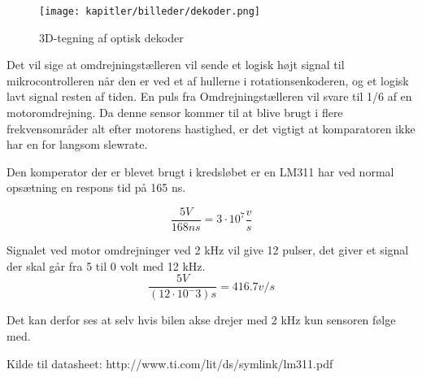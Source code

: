\begin{figure}[ht]
    \centering
    \texttt{[image: kapitler/billeder/dekoder.png]}
    \caption{3D-tegning af optisk dekoder}
    \label{fig:dekoder}
\end{figure}


Det vil sige at omdrejningstælleren vil sende et logisk højt signal til mikrocontrolleren når den er ved et af hullerne i  rotationsenkoderen, og et logisk lavt signal resten af tiden. En puls fra Omdrejningstælleren vil svare til 1/6 af en motoromdrejning.
Da denne sensor kommer til at blive brugt i flere frekvensområder alt efter motorens hastighed, er det vigtigt at komparatoren ikke har en for langsom slewrate.

Den komperator der er blevet brugt i kredsløbet er en LM311 har ved normal opsætning en respons tid på 165 ns.

\begin{equation}
\frac{5 V}{168 ns} = 3 \cdot 10^7 \frac{v}{s}
\end{equation}

Signalet ved motor omdrejninger ved 2 kHz vil give 12 pulser, det giver et signal der skal går fra 5 til 0 volt med 12 kHz.
\begin{equation}
\frac{5 V}{(12 \cdot 10^-3)s} = 416.7 v/s
\end{equation}

Det kan derfor ses at selv hvis bilen akse drejer med 2 kHz kun sensoren følge med.


Kilde til datasheet: http://www.ti.com/lit/ds/symlink/lm311.pdf

